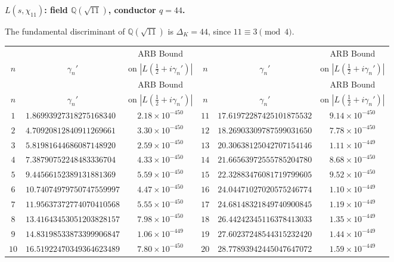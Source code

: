 \documentclass[12pt,reqno]{amsart}
\theoremstyle{plain}
\theoremstyle{definition}
\theoremstyle{remark}
\newcommand{\Q}{\mathbb{Q}}
\begin{document}
\medskip\noindent\textbf{$L(s,\chi_{11})$: field $\Q(\sqrt{11})$, conductor $q=44$.}\par\smallskip
\label{app:chi44-zeros}

The fundamental discriminant of $\Q(\sqrt{11})$ is $\Delta_K = 44$, since $11 \equiv 3 \pmod{4}$.

\renewcommand{\arraystretch}{1.05}\footnotesize
\begin{longtable}{clc|clc}
\toprule
 & & \multicolumn{1}{c}{ARB Bound} &
 & & \multicolumn{1}{c}{ARB Bound} \\
$n$ & \multicolumn{1}{c}{$\gamma_n'$} & \multicolumn{1}{c}{on $|L(\tfrac{1}{2}+i\gamma_n')|$} &
$n$ & \multicolumn{1}{c}{$\gamma_n'$} & \multicolumn{1}{c}{on $|L(\tfrac{1}{2}+i\gamma_n')|$} \\
\midrule
\endfirsthead
\toprule
 & & \multicolumn{1}{c}{ARB Bound} &
 & & \multicolumn{1}{c}{ARB Bound} \\
$n$ & \multicolumn{1}{c}{$\gamma_n'$} & \multicolumn{1}{c}{on $|L(\tfrac{1}{2}+i\gamma_n')|$} &
$n$ & \multicolumn{1}{c}{$\gamma_n'$} & \multicolumn{1}{c}{on $|L(\tfrac{1}{2}+i\gamma_n')|$} \\
\midrule
\endhead
\bottomrule
\endlastfoot
$1$ & $1.86993927318275168340$ & $2.18 \times 10^{-450}$ & $11$ & $17.61972287425101875532$ & $9.14 \times 10^{-450}$ \\
$2$ & $4.70920812840911269661$ & $3.30 \times 10^{-450}$ & $12$ & $18.26903309787599031650$ & $7.78 \times 10^{-450}$ \\
$3$ & $5.81981644686087148920$ & $2.59 \times 10^{-450}$ & $13$ & $20.30638125042707154146$ & $1.11 \times 10^{-449}$ \\
$4$ & $7.38790752248483336704$ & $4.33 \times 10^{-450}$ & $14$ & $21.66563972555785204780$ & $8.68 \times 10^{-450}$ \\
$5$ & $9.44566152389131881369$ & $5.59 \times 10^{-450}$ & $15$ & $22.32883476081719799605$ & $9.52 \times 10^{-450}$ \\
$6$ & $10.74074979750747559997$ & $4.47 \times 10^{-450}$ & $16$ & $24.04471027020575246774$ & $1.10 \times 10^{-449}$ \\
$7$ & $11.95637372774070410568$ & $5.55 \times 10^{-450}$ & $17$ & $24.68148321849740900845$ & $1.19 \times 10^{-449}$ \\
$8$ & $13.41643453051203828157$ & $7.98 \times 10^{-450}$ & $18$ & $26.44242345116378413033$ & $1.35 \times 10^{-449}$ \\
$9$ & $14.83198533873399906847$ & $1.06 \times 10^{-449}$ & $19$ & $27.60237248544315232420$ & $1.44 \times 10^{-449}$ \\
$10$ & $16.51922470349364623489$ & $7.80 \times 10^{-450}$ & $20$ & $28.77893942445047647072$ & $1.59 \times 10^{-449}$ \\

\end{longtable}
\normalsize
\end{document}
